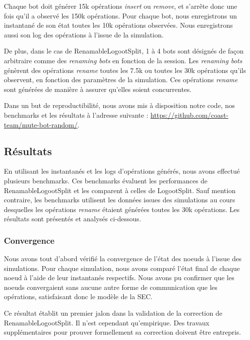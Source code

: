 \documentclass[12pt]{thesul}
\begin{document}
Chaque bot doit générer 15k opérations \emph{insert} ou \emph{remove}, et s'arrête donc une fois qu'il a observé les 150k opérations.
Pour chaque bot, nous enregistrons un instantané de son état toutes les 10k opérations observées.
Nous enregistrons aussi son log des opérations à l'issue de la simulation.

De plus, dans le cas de RenamableLogootSplit, 1 à 4 bots sont désignés de façon arbitraire comme des \emph{renaming bots} en fonction de la session.
Les \emph{renaming bots} génèrent des opérations \emph{rename} toutes les 7.5k ou toutes les 30k opérations qu'ils observent, en fonction des paramètres de la simulation.
Ces opérations \emph{rename} sont générées de manière à assurer qu'elles soient concurrentes.

Dans un but de reproductibilité, nous avons mis à disposition notre code, nos benchmarks et les résultats à l'adresse suivante : \url{https://github.com/coast-team/mute-bot-random/}.

\subsection{Résultats}

\label{sec:evaluation-results}

En utilisant les instantanés et les logs d'opérations générés, nous avons effectué plusieurs benchmarks.
Ces benchmarks évaluent les performances de RenamableLogootSplit et les comparent à celles de LogootSplit.
Sauf mention contraire, les benchmarks utilisent les données issues des simulations au cours desquelles les opérations \emph{rename} étaient générées toutes les 30k opérations.
Les résultats sont présentés et analysés ci-dessous.

\subsubsection{Convergence}

Nous avons tout d'abord vérifié la convergence de l'état des noeuds à l'issue des simulations.
Pour chaque simulation, nous avons comparé l'état final de chaque noeud à l'aide de leur instantanés respectifs.
Nous avons pu confirmer que les noeuds convergaient sans aucune autre forme de communication que les opérations, satisfaisant donc le modèle de la \ac{SEC}.

Ce résultat établit un premier jalon dans la validation de la correction de RenamableLogootSplit.
Il n'est cependant qu'empirique.
Des travaux supplémentaires pour prouver formellement sa correction doivent être entrepris.
\end{document}
